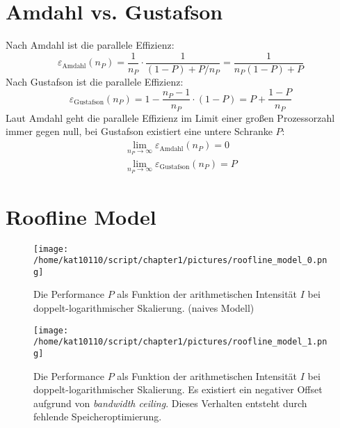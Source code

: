 		\newpage
        \section{Amdahl vs. Gustafson}		
        Nach Amdahl ist die \gls{parallele Effizienz}:
        \begin{equation}
            \varepsilon_{\text{Amdahl}}(n_P)    = \frac1{n_P}\cdot \frac1{(1-P)+P/n_P} = \frac1{n_P(1-P)+P}
        \end{equation} 
        Nach Gustafson ist die \gls{parallele Effizienz}:
        \begin{equation}
			\varepsilon_{\text{Gustafson}}(n_P) = 1 - \frac{n_P-1}{n_P}\cdot (1-P) = P +\frac{1-P}{n_P}
        \end{equation}
		Laut Amdahl geht die \gls{parallele Effizienz} im Limit einer großen Prozessorzahl immer gegen null, bei Gustafson existiert eine untere Schranke $P$:
        \begin{gather*}
        	\lim\limits_{n_P \rightarrow \infty}\varepsilon_{\text{Amdahl}}(n_P)    = 0 \\        
        	\lim\limits_{n_P \rightarrow \infty}\varepsilon_{\text{Gustafson}}(n_P) = P
        \end{gather*}

		\newpage
		\section{Roofline Model}
		\begin{figure}[t]
			\centering
	    	\texttt{[image: /home/kat10110/script/chapter1/pictures/roofline\_model\_0.png]}
    		\caption[Roofline Modell - naiv]{Die Performance $P$ als Funktion der arithmetischen Intensität $I$ bei doppelt-logarithmischer Skalierung. (naives Modell) \autocite{wikiRLM}}
    		\label{1:rl0}
		\end{figure}

		\begin{figure}[t]
			\centering
	    	\texttt{[image: /home/kat10110/script/chapter1/pictures/roofline\_model\_1.png]}
    		\caption[Roofline Modell - \textit{bandwidth ceiling}]{Die Performance $P$ als Funktion der arithmetischen Intensität $I$ bei doppelt-logarithmischer Skalierung. Es existiert ein negativer Offset aufgrund von \textit{bandwidth ceiling}. Dieses Verhalten entsteht durch fehlende Speicheroptimierung. \autocite{wikiRLM}}
    		\label{1:rl1}
		\end{figure}
	
